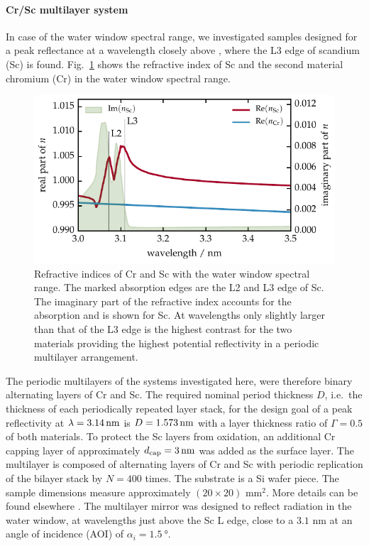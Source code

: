 \paragraph{Cr/Sc multilayer system}
In case of the water window spectral range, we investigated samples designed for a peak reflectance at a wavelength closely above , where the L3 edge of scandium (Sc) is found. Fig.~\ref{ch_exp:fig_crsc_contrast} shows the refractive index of Sc and the second material chromium (Cr) in the water window spectral range. 
\begin{figure}[htb]
        \includegraphics{img/Cr_Sc_contrast}
        \caption[Refractive indices of Cr and Sc in the water window.]{%
            Refractive indices of Cr and Sc with the water window spectral range. The marked absorption edges are the L2 and L3 edge of Sc. The imaginary part of the refractive index accounts for the absorption and is shown for Sc. At wavelengths only slightly larger than that of the L3 edge is the highest contrast for the two materials providing the highest potential reflectivity in a periodic multilayer arrangement.}
        \label{ch_exp:fig_crsc_contrast}
\end{figure}
The periodic multilayers of the systems investigated here, were therefore binary alternating layers of Cr and Sc. The required nominal period thickness $D$, i.e.~the thickness of each periodically repeated layer stack, for the design goal of a peak reflectivity at $\lambda=\nm{3.14}$ is $D=\nm{1.573}$ with a layer thickness ratio of $\Gamma=0.5$ of both materials. To protect the Sc layers from oxidation, an additional Cr capping layer of approximately $d_\text{cap} = \nm{3}$ was added as the surface layer. The multilayer is composed of alternating layers of Cr and Sc with periodic replication of the bilayer stack by $N=400$ times. The substrate is a Si wafer piece. The sample dimensions measure 
approximately $(20 \times 20)$ mm$^2$. More details can be found elsewhere \cite{prasciolu_thermal_2014}. The multilayer mirror was designed to reflect radiation in the water window, at wavelengths just above the Sc L edge, close to a $3.1$ nm at an angle of incidence (AOI) of $\alpha_i = \SI{1.5}{\degree}$.

